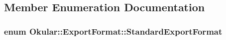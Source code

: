\subsection{Member Enumeration Documentation}
\hypertarget{classOkular_1_1ExportFormat_af030ecc6c77b5cdd89cd1bc4a894c6f2}{
\subsubsection[{Standard\+Export\+Format}]{\setlength{\rightskip}{0pt plus 5cm}enum {\bf Okular\+::\+Export\+Format\+::\+Standard\+Export\+Format}}}\label{classOkular_1_1ExportFormat_af030ecc6c77b5cdd89cd1bc4a894c6f2}
